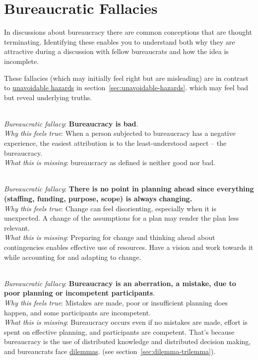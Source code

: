 \section{Bureaucratic Fallacies\label{sec:fallacies}}

In discussions about bureaucracy there are common conceptions that are \gls{thought terminating}. Identifying these enables you to understand both why they are attractive during a discussion with fellow bureaucrats and how the idea is incomplete.

These fallacies (which may initially feel right but are misleading) are in contrast to  \hyperref[sec:unavoidable-hazards]{unavoidable hazards}
\ifsectionref
in section~\ref{sec:unavoidable-hazards}.
\fi
which may feel bad but reveal underlying truths.

\ \\
\textit{Bureaucratic fallacy}: \textbf{Bureaucracy is bad}. \\
\textit{Why this feels true}: When a person subjected to bureaucracy has a negative experience, the easiest attribution is to the least-understood aspect -- the bureaucracy.\\
\textit{What this is missing}: \Gls{bureaucracy} as defined is neither good nor bad. 

\ \\
\textit{Bureaucratic fallacy}: 
\textbf{There is no point in planning ahead since everything (staffing, funding, purpose, scope) is always changing.}\\
\textit{Why this feels true}: Change can feel disorienting, especially when it is unexpected. A change of the assumptions for a plan may render the plan less relevant. \\
\textit{What this is missing}: Preparing for change and thinking ahead about contingencies enables effective use of resources. Have a vision and work towards it while accounting for and adapting to change. 


\ \\
\textit{Bureaucratic fallacy}: \textbf{Bureaucracy is an aberration, a mistake, due to poor planning or incompetent participants}. \\
\textit{Why this feels true}: Mistakes are made, poor or insufficient planning does happen, and some participants are incompetent.\\
\textit{What this is missing}: Bureaucracy occurs even if no mistakes are made, effort is spent on effective planning, and participants are competent. That's because bureaucracy is the use of distributed knowledge and distributed decision making, and bureaucrats face \hyperref[sec:dilemma-trilemma]{dilemmas}.
\ifsectionref
(see section~\ref{sec:dilemma-trilemma}).
\fi

